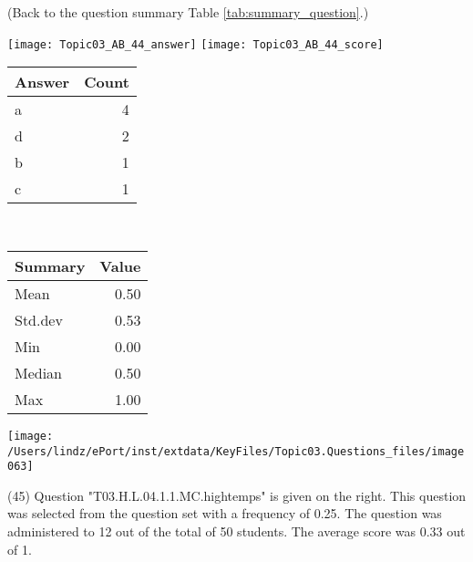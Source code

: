 \documentclass[12pt,english,nohyper]{tufte-handout}\usepackage[]{graphicx}\usepackage[]{color}
\begin{document}
 (Back to the question summary Table \ref{tab:summary_question}.)

\begin{center} \texttt{[image: Topic03\_AB\_44\_answer]} \texttt{[image: Topic03\_AB\_44\_score]} \end{center} 

\begin{center}%
\begin{tabular}{lr}
  \hline
Answer & Count \\ 
  \hline
a &   4 \\ 
  d &   2 \\ 
  b &   1 \\ 
  c &   1 \\ 
   \hline
\end{tabular}
~~~~~~~~%
\begin{tabular}{lr}
  \hline
Summary & Value \\ 
  \hline
Mean & 0.50 \\ 
  Std.dev & 0.53 \\ 
  Min & 0.00 \\ 
  Median & 0.50 \\ 
  Max & 1.00 \\ 
   \hline
\end{tabular}
\end{center}\newpage{}



\vspace{5cm}\begin{marginfigure}\texttt{[image: /Users/lindz/ePort/inst/extdata/KeyFiles/Topic03.Questions\_files/image063]}\end{marginfigure}\vspace{-5cm} (45) Question "T03.H.L.04.1.1.MC.hightemps" is given on the right. This question was selected from the question set with a frequency of 0.25. The question was administered to 12 out of the total of 50 students. The average score was 0.33 out of 1.
\end{document}

